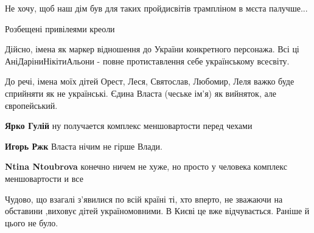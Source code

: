 \begin{itemize}
Не хочу, щоб наш дім був для таких пройдисвітів трампліном в мєста палучше...

Розбещені привілеями креоли🤦

 

Дійсно, імена як маркер відношення до України конкретного персонажа. Всі ці
АніДаріниНікітиАльони - повне протиставлення себе українському всесвіту.

До речі, імена моїх дітей Орест, Леся, Святослав, Любомир, Леля важко буде
сприйняти як не українські. Єдина Власта (чеське ім'я) як вийняток, але
європейський.

\begin{itemize}
 
\textbf{Ярко Гулій} ну получается комплекс меншовартости перед чехами

 
\textbf{Игорь Ржк} Власта нічим не гірше Влади.

 
\textbf{Ntina Ntoubrova} конечно ничем не хуже, но просто у человека комплекс меншовартости и все
\end{itemize}

 

Чудово, що взагалі з'явилися по всій країні ті, хто вперто, не зважаючи на
обставини ,виховує дітей україномовними. В Києві це вже відчувається. Раніше й
цього не було.



\end{itemize}
